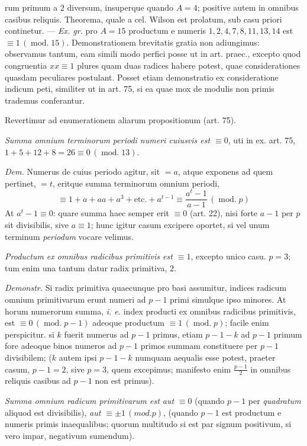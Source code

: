 rum primum a $2$ diversum, insuperque quando $A=4$; positive autem in omnibus casibus reliquis. Theorema, quale a cel. Wilson est prolatum, sub casu priori continetur. --- \emph{Ex. gr.} pro $A=15$ productum e numeris $1,2,4,7,8,11,13,14$ est $\equiv1\,(\operatorname{mod.}15)$. Demonstrationem brevitatis gratia non adiungimus: observamus tantum, eam simili modo perfici posse ut in art. praec., excepto quod congruentia $xx\equiv1$ plures quam duas radices habere potest, quae considerationes quasdam peculiares postulant. Posset etiam demonstratio ex consideratione indicum peti, similiter ut in art. 75, si ea quae mox de modulis non primis trademus conferantur.

Revertimur ad enumerationem aliarum propositionum (art. 75).

\emph{Summa omnium terminorum periodi numeri cuiusvis est $\equiv0$}, uti in ex. art. 75, $1+5+12+8=26\equiv0\,(\operatorname{mod.}13)$.

\emph{Dem.} Numerus de cuius periodo agitur, sit $=a$, atque exponens ad quem pertinet, $=t$, eritque summa terminorum omnium periodi,
\[\equiv1+a+aa+a^3+\text{etc.}+a^{t-1}\equiv\frac{a^t-1}{a-1}\,(\operatorname{mod.}p)\]
At $a^t-1\equiv0$: quare summa haec semper erit $\equiv0$ (art. 22), nisi forte $a-1$ per $p$ sit divisibilis, sive $a\equiv1$; hunc igitur casum excipere oportet, si vel unum terminum \emph{periodum} vocare velimus.

\emph{Productum ex omnibus radicibus primitivis est $\equiv1$}, excepto unico casu. $p=3$; tum enim una tantum datur radix primitiva, $2$.

\emph{Demonstr.} Si radix primitiva quaecunque pro basi assumitur, indices radicum omnium primitivarum erunt numeri ad $p-1$ primi simulque ipso minores. At horum numerorum summa, \emph{i. e.} index producti ex omnibus radicibus primitivis, est $\equiv0\,(\operatorname{mod.}p-1)$ adeoque productum $\equiv1\,(\operatorname{mod.}p)$; facile enim perspicitur. si $k$ fuerit numerus ad $p-1$ primus, etiam $p-1-k$ ad $p-1$ primum fore adeoque binos numeros ad $p-1$ primos summam constituere per $p-1$ divisibilem; ($k$ autem ipsi $p-1-k$ numquam aequalis esse potest, praeter casum, $p-1=2$, sive $p=3$, quem excepimus; manifesto enim $\frac{p-1}{2}$ in omnibus reliquis casibus ad $p-1$ non est primus).

\emph{Summa omnium radicum primitivarum est aut} $\equiv0$ (quando $p-1$ per \emph{quadratum} aliquod est divisibilis), \emph{aut $\equiv\pm1\,(\mathit{mod.}p)$}, (quando $p-1$ est productum e numeris primis inaequalibus; quorum multitudo si est par signum positivum, si vero impar, negativum sumendum).

